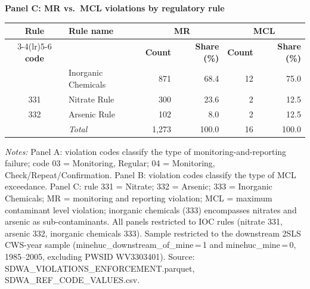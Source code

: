 \begin{table}[htbp]
\noindent\textbf{Panel C: MR vs.~MCL violations by regulatory rule} \\[4pt]
\begin{tabular}{clrrrr}
\hline\hline
\textbf{Rule} & \textbf{Rule name} & \multicolumn{2}{c}{\textbf{MR}} & \multicolumn{2}{c}{\textbf{MCL}} \\
\cmidrule(lr){3-4}\cmidrule(lr){5-6}
\textbf{code} & & \textbf{Count} & \textbf{Share (\%)} & \textbf{Count} & \textbf{Share (\%)} \\
\hline
\addlinespace[2pt]
333 & Inorganic Chemicals & 871 & 68.4 & 12 & 75.0 \\
331 & Nitrate Rule & 300 & 23.6 & 2 & 12.5 \\
332 & Arsenic Rule & 102 & 8.0 & 2 & 12.5 \\
\addlinespace[2pt]
\hline
  & \textit{Total} & 1,273 & 100.0 & 16 & 100.0 \\
\hline\hline
\end{tabular}
\begin{minipage}{\linewidth}
\vspace{4pt}
\footnotesize
\textit{Notes:} Panel A: violation codes classify the type of monitoring-and-reporting failure; code 03 = Monitoring, Regular; 04 = Monitoring, Check/Repeat/Confirmation. Panel B: violation codes classify the type of MCL exceedance. Panel C: rule 331 = Nitrate; 332 = Arsenic; 333 = Inorganic Chemicals; MR = monitoring and reporting violation; MCL = maximum contaminant level violation; inorganic chemicals (333) encompasses nitrates and arsenic as sub-contaminants. All panels restricted to IOC rules (nitrate 331, arsenic 332, inorganic chemicals 333). Sample restricted to the downstream 2SLS CWS-year sample (minehuc\_downstream\_of\_mine\,=\,1 and minehuc\_mine\,=\,0, 1985--2005, excluding PWSID WV3303401). Source: SDWA\_VIOLATIONS\_ENFORCEMENT.parquet, SDWA\_REF\_CODE\_VALUES.csv.
\end{minipage}
\end{table}
